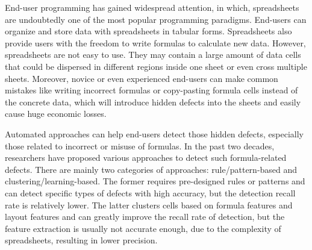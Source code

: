 \begin{englishabstract}

End-user programming has gained widespread attention, in which, spreadsheets are undoubtedly one of the most popular programming paradigms.
End-users can organize and store data with spreadsheets in tabular forms.
Spreadsheets also provide users with the freedom to write formulas to calculate new data.
However, spreadsheets are not easy to use. 
They may contain a large amount of data cells that could be dispersed in different regions inside one sheet or even cross multiple sheets. 
Moreover, novice or even experienced end-users can make common mistakes like writing incorrect formulas or copy-pasting formula cells instead of the concrete data, which will introduce hidden defects into the sheets and easily cause huge economic losses.

Automated approaches can help end-users detect those hidden defects, especially those related to incorrect or misuse of formulas. 
In the past two decades, researchers have proposed various approaches to detect such formula-related defects. 
There are mainly two categories of approaches: 
rule/pattern-based and clustering/learning-based. 
The former requires pre-designed rules or patterns and can detect specific types of defects with high accuracy, 
but the detection recall rate is relatively lower. 
The latter clusters cells based on formula features and layout features and can greatly improve the recall rate of detection, 
but the feature extraction is usually not accurate enough, due to the complexity of spreadsheets, resulting in lower precision.



\end{englishabstract}
